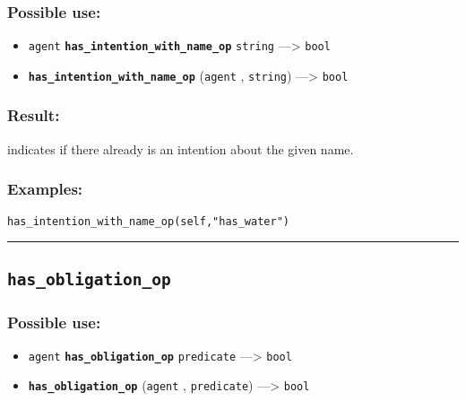 \documentclass[]{book}
\providecommand{\tightlist}{%
  \setlength{\itemsep}{0pt}\setlength{\parskip}{0pt}}
\theoremstyle{definition}
\theoremstyle{definition}
\theoremstyle{definition}
\theoremstyle{remark}
\begin{document}
\subsubsection{Possible use:}\label{possible-use-253}

\begin{itemize}
\tightlist
\item
  \texttt{agent} \textbf{\texttt{has\_intention\_with\_name\_op}}
  \texttt{string} ---\textgreater{} \texttt{bool}
\item
  \textbf{\texttt{has\_intention\_with\_name\_op}} (\texttt{agent} ,
  \texttt{string}) ---\textgreater{} \texttt{bool}
\end{itemize}

\subsubsection{Result:}\label{result-244}

indicates if there already is an intention about the given name.

\subsubsection{Examples:}\label{examples-193}

\begin{verbatim}
has_intention_with_name_op(self,"has_water") 
\end{verbatim}

\begin{center}\rule{0.5\linewidth}{\linethickness}\end{center}

\subsection{\texorpdfstring{\texttt{has\_obligation\_op}}{has\_obligation\_op}}\label{has_obligation_op}

\subsubsection{Possible use:}\label{possible-use-254}

\begin{itemize}
\tightlist
\item
  \texttt{agent} \textbf{\texttt{has\_obligation\_op}}
  \texttt{predicate} ---\textgreater{} \texttt{bool}
\item
  \textbf{\texttt{has\_obligation\_op}} (\texttt{agent} ,
  \texttt{predicate}) ---\textgreater{} \texttt{bool}
\end{itemize}
\end{document}
